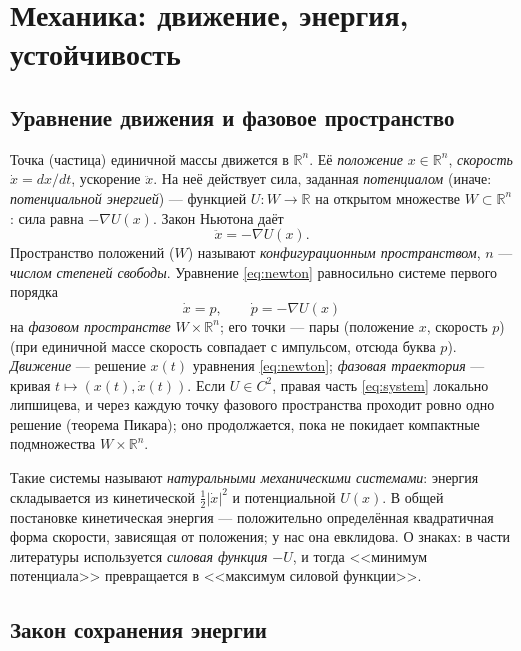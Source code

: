 \documentclass[11pt,a4paper]{article}
\theoremstyle{definition}
\newcommand{\R}{\mathbb R}
\newcommand{\term}[1]{\emph{#1}}
\begin{document}
\tableofcontents

\section{Механика: движение, энергия, устойчивость}\label{sec:mech}

\subsection{Уравнение движения и фазовое пространство}

Точка (частица) единичной массы движется в $\R^n$. Её \term{положение} $x\in\R^n$, \term{скорость}
$\dot x=dx/dt$, ускорение $\ddot x$. На неё действует сила, заданная \term{потенциалом} (иначе:
\term{потенциальной энергией}) --- функцией $U\colon W\to\R$ на открытом множестве $W\subset\R^n$:
сила равна $-\nabla U(x)$. Закон Ньютона даёт
\begin{equation}\label{eq:newton}
\ddot x=-\nabla U(x).
\end{equation}
Пространство положений ($W$) называют \term{конфигурационным пространством}, $n$ --- \term{числом
степеней свободы}. Уравнение \eqref{eq:newton} равносильно системе первого порядка
\begin{equation}\label{eq:system}
\dot x=p,\qquad \dot p=-\nabla U(x)
\end{equation}
на \term{фазовом пространстве} $W\times\R^n$; его точки --- пары (положение $x$, скорость $p$)
(при единичной массе скорость совпадает с импульсом, отсюда буква $p$). \term{Движение} ---
решение $x(t)$ уравнения \eqref{eq:newton}; \term{фазовая траектория} --- кривая
$t\mapsto(x(t),\dot x(t))$. Если $U\in C^2$, правая часть \eqref{eq:system} локально липшицева, и
через каждую точку фазового пространства проходит ровно одно решение (теорема Пикара); оно
продолжается, пока не покидает компактные подмножества $W\times\R^n$.

Такие системы называют \term{натуральными механическими системами}: энергия складывается из
кинетической $\tfrac12|\dot x|^2$ и потенциальной $U(x)$. В общей постановке кинетическая
энергия --- положительно определённая квадратичная форма скорости, зависящая от положения;
у нас она евклидова. О знаках: в части литературы используется \term{силовая функция} $-U$, и
тогда <<минимум потенциала>> превращается в <<максимум силовой функции>>.

\subsection{Закон сохранения энергии}
\end{document}
